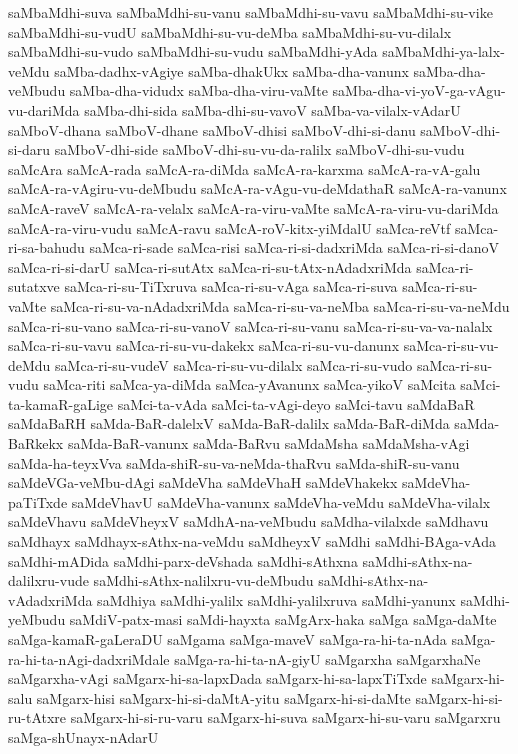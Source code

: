 {saMbaMdhi-suva
saMbaMdhi-su-vanu
saMbaMdhi-su-vavu
saMbaMdhi-su-vike
saMbaMdhi-su-vudU
saMbaMdhi-su-vu-deMba
saMbaMdhi-su-vu-dilalx
saMbaMdhi-su-vudo
saMbaMdhi-su-vudu
saMbaMdhi-yAda
saMbaMdhi-ya-lalx-veMdu
saMba-dadhx-vAgiye
saMba-dhakUkx
saMba-dha-vanunx
saMba-dha-veMbudu
saMba-dha-vidudx
saMba-dha-viru-vaMte
saMba-dha-vi-yoV-ga-vAgu-vu-dariMda
saMba-dhi-sida
saMba-dhi-su-vavoV
saMba-va-vilalx-vAdarU
saMboV-dhana
saMboV-dhane
saMboV-dhisi
saMboV-dhi-si-danu
saMboV-dhi-si-daru
saMboV-dhi-side
saMboV-dhi-su-vu-da-ralilx
saMboV-dhi-su-vudu
saMcAra
saMcA-rada
saMcA-ra-diMda
saMcA-ra-karxma
saMcA-ra-vA-galu
saMcA-ra-vAgiru-vu-deMbudu
saMcA-ra-vAgu-vu-deMdathaR
saMcA-ra-vanunx
saMcA-raveV
saMcA-ra-velalx
saMcA-ra-viru-vaMte
saMcA-ra-viru-vu-dariMda
saMcA-ra-viru-vudu
saMcA-ravu
saMcA-roV-kitx-yiMdalU
saMca-reVtf
saMca-ri-sa-bahudu
saMca-ri-sade
saMca-risi
saMca-ri-si-dadxriMda
saMca-ri-si-danoV
saMca-ri-si-darU
saMca-ri-sutAtx
saMca-ri-su-tAtx-nAdadxriMda
saMca-ri-sutatxve
saMca-ri-su-TiTxruva
saMca-ri-su-vAga
saMca-ri-suva
saMca-ri-su-vaMte
saMca-ri-su-va-nAdadxriMda
saMca-ri-su-va-neMba
saMca-ri-su-va-neMdu
saMca-ri-su-vano
saMca-ri-su-vanoV
saMca-ri-su-vanu
saMca-ri-su-va-va-nalalx
saMca-ri-su-vavu
saMca-ri-su-vu-dakekx
saMca-ri-su-vu-danunx
saMca-ri-su-vu-deMdu
saMca-ri-su-vudeV
saMca-ri-su-vu-dilalx
saMca-ri-su-vudo
saMca-ri-su-vudu
saMca-riti
saMca-ya-diMda
saMca-yAvanunx
saMca-yikoV
saMcita
saMci-ta-kamaR-gaLige
saMci-ta-vAda
saMci-ta-vAgi-deyo
saMci-tavu
saMdaBaR
saMdaBaRH
saMda-BaR-dalelxV
saMda-BaR-dalilx
saMda-BaR-diMda
saMda-BaRkekx
saMda-BaR-vanunx
saMda-BaRvu
saMdaMsha
saMdaMsha-vAgi
saMda-ha-teyxVva
saMda-shiR-su-va-neMda-thaRvu
saMda-shiR-su-vanu
saMdeVGa-veMbu-dAgi
saMdeVha
saMdeVhaH
saMdeVhakekx
saMdeVha-paTiTxde
saMdeVhavU
saMdeVha-vanunx
saMdeVha-veMdu
saMdeVha-vilalx
saMdeVhavu
saMdeVheyxV
saMdhA-na-veMbudu
saMdha-vilalxde
saMdhavu
saMdhayx
saMdhayx-sAthx-na-veMdu
saMdheyxV
saMdhi
saMdhi-BAga-vAda
saMdhi-mADida
saMdhi-parx-deVshada
saMdhi-sAthxna
saMdhi-sAthx-na-dalilxru-vude
saMdhi-sAthx-nalilxru-vu-deMbudu
saMdhi-sAthx-na-vAdadxriMda
saMdhiya
saMdhi-yalilx
saMdhi-yalilxruva
saMdhi-yanunx
saMdhi-yeMbudu
saMdiV-patx-masi
saMdi-hayxta
saMgArx-haka
saMga
saMga-daMte
saMga-kamaR-gaLeraDU
saMgama
saMga-maveV
saMga-ra-hi-ta-nAda
saMga-ra-hi-ta-nAgi-dadxriMdale
saMga-ra-hi-ta-nA-giyU
saMgarxha
saMgarxhaNe
saMgarxha-vAgi
saMgarx-hi-sa-lapxDada
saMgarx-hi-sa-lapxTiTxde
saMgarx-hi-salu
saMgarx-hisi
saMgarx-hi-si-daMtA-yitu
saMgarx-hi-si-daMte
saMgarx-hi-si-ru-tAtxre
saMgarx-hi-si-ru-varu
saMgarx-hi-suva
saMgarx-hi-su-varu
saMgarxru
saMga-shUnayx-nAdarU
}
